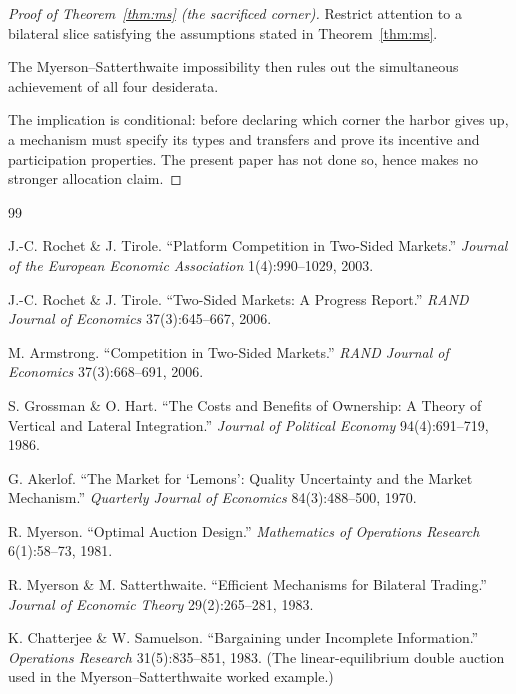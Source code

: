 \documentclass[11pt,a4paper]{article}
\theoremstyle{definition}
\theoremstyle{definition}
\theoremstyle{remark}
\begin{document}
\begin{proof}[Proof of Theorem~\ref{thm:ms} (the sacrificed corner)]
\setlength{\parskip}{4pt plus 1pt}
Restrict attention to a bilateral slice satisfying the assumptions stated in
Theorem~\ref{thm:ms}. 

The Myerson--Satterthwaite impossibility then rules out the
simultaneous achievement of all four desiderata. 

The implication is conditional:
before declaring which corner the harbor gives up, a mechanism must specify its
types and transfers and prove its incentive and participation properties. The
present paper has not done so, hence makes no stronger allocation claim.
\end{proof}
\pdprintsolutions
\begin{thebibliography}{99}

 J.-C. Rochet \& J. Tirole. ``Platform Competition in Two-Sided
Markets.'' \emph{Journal of the European Economic Association} 1(4):990--1029, 2003.

 J.-C. Rochet \& J. Tirole. ``Two-Sided Markets: A Progress
Report.'' \emph{RAND Journal of Economics} 37(3):645--667, 2006.

 M. Armstrong. ``Competition in Two-Sided Markets.''
\emph{RAND Journal of Economics} 37(3):668--691, 2006.

 S. Grossman \& O. Hart. ``The Costs and Benefits of
Ownership: A Theory of Vertical and Lateral Integration.'' \emph{Journal of
Political Economy} 94(4):691--719, 1986.

 G. Akerlof. ``The Market for `Lemons': Quality Uncertainty and
the Market Mechanism.'' \emph{Quarterly Journal of Economics} 84(3):488--500, 1970.

 R. Myerson. ``Optimal Auction Design.'' \emph{Mathematics of
Operations Research} 6(1):58--73, 1981.

 R. Myerson \& M. Satterthwaite. ``Efficient Mechanisms for
Bilateral Trading.'' \emph{Journal of Economic Theory} 29(2):265--281, 1983.

 K. Chatterjee \& W. Samuelson. ``Bargaining under
Incomplete Information.'' \emph{Operations Research} 31(5):835--851, 1983. (The
linear-equilibrium double auction used in the Myerson--Satterthwaite worked
example.)


\end{thebibliography}
\end{document}
